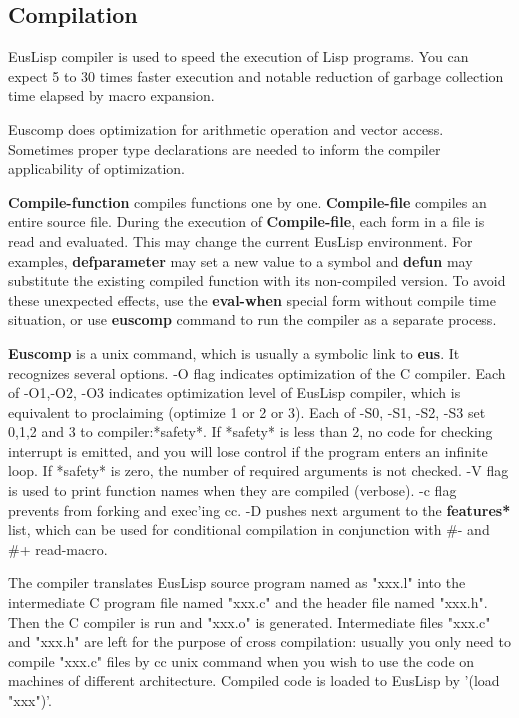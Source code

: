 \begin{refdesc}

\end{refdesc}

\newpage

\subsection{Compilation}\label{compiler}

EusLisp compiler is used to speed the execution of Lisp programs.
You can expect 5 to 30 times faster execution and notable reduction of garbage
collection time elapsed by macro expansion.

Euscomp does optimization for arithmetic operation and vector access.
Sometimes proper type declarations are needed to inform
the compiler applicability of optimization.

{\bf Compile-function} compiles functions one by one.
{\bf Compile-file}  compiles an entire source file.
During the execution of {\bf Compile-file}, each form in a file
is read and evaluated.
This may change the current EusLisp environment.
For examples, {\bf defparameter}
may set a new value to a symbol and {\bf defun} may substitute the existing
compiled function with its non-compiled version.
To avoid these unexpected effects, use the {\bf eval-when} special form
without compile time situation,
or use {\bf euscomp} command to run the compiler as a separate process.

{\bf Euscomp} is a unix command, which is usually a symbolic link to {\bf eus}.
It recognizes several options.
-O flag indicates optimization of the C compiler.
Each of -O1,-O2, -O3 indicates optimization level of EusLisp compiler,
which is equivalent to proclaiming (optimize 1 or 2 or 3).
Each of -S0, -S1, -S2, -S3 set 0,1,2 and 3 to compiler:*safety*.
If *safety* is less than 2, no code for checking interrupt is emitted,
and you will lose control if the program enters an infinite loop.
If *safety* is zero, the number of required arguments is not checked.
-V flag is used to print function names when they are compiled (verbose).
-c flag prevents from forking and exec'ing cc.
-D pushes next argument to the {\bf *features*} list, which can be used for
conditional compilation in conjunction with \#- and \#+ read-macro.

The compiler translates EusLisp source program named as "xxx.l" 
into the intermediate C program file named "xxx.c" and the  header file
named "xxx.h".
Then the C compiler is run and "xxx.o" is generated.
Intermediate files "xxx.c" and "xxx.h" are left
for the purpose of cross compilation:
usually you only need to compile "xxx.c" files by cc unix command
when you wish to use the code on machines of different architecture.
Compiled code is loaded to EusLisp by '(load "xxx")'.

